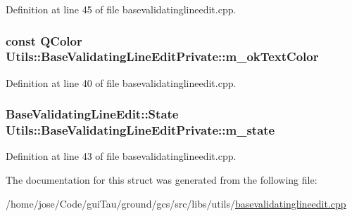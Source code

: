 Definition at line 45 of file basevalidatinglineedit.\-cpp.

\hypertarget{struct_utils_1_1_base_validating_line_edit_private_a93a0919e984d20572667722990e1f3ec}{
\subsubsection[{m\-\_\-ok\-Text\-Color}]{\setlength{\rightskip}{0pt plus 5cm}const Q\-Color Utils\-::\-Base\-Validating\-Line\-Edit\-Private\-::m\-\_\-ok\-Text\-Color}}\label{struct_utils_1_1_base_validating_line_edit_private_a93a0919e984d20572667722990e1f3ec}


Definition at line 40 of file basevalidatinglineedit.\-cpp.

\hypertarget{struct_utils_1_1_base_validating_line_edit_private_a5f2abc5b382f1099afcd254f43460031}{
\subsubsection[{m\-\_\-state}]{\setlength{\rightskip}{0pt plus 5cm}Base\-Validating\-Line\-Edit\-::\-State Utils\-::\-Base\-Validating\-Line\-Edit\-Private\-::m\-\_\-state}}\label{struct_utils_1_1_base_validating_line_edit_private_a5f2abc5b382f1099afcd254f43460031}


Definition at line 43 of file basevalidatinglineedit.\-cpp.



The documentation for this struct was generated from the following file\-:\begin{DoxyCompactItemize}
\item 
/home/jose/\-Code/gui\-Tau/ground/gcs/src/libs/utils/\hyperlink{basevalidatinglineedit_8cpp}{basevalidatinglineedit.\-cpp}\end{DoxyCompactItemize}
